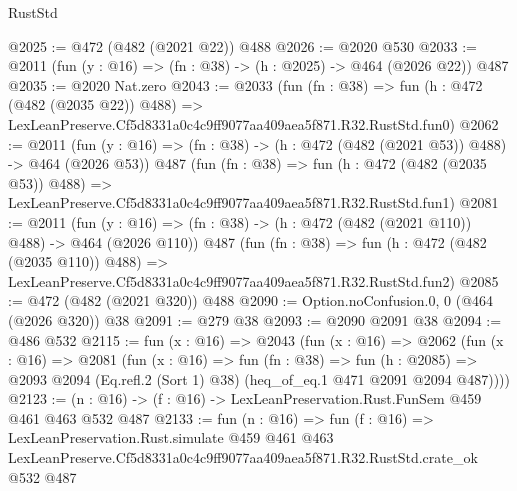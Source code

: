 \begin{lexlean}{RustStd}
\begin{coremodule}
@2025 := @472 (@482 (@2021 @22)) @488
@2026 := @2020 @530
@2033 := @2011 (fun (y : @16) => (fn : @38) -> (h : @2025) -> @464 (@2026 @22)) @487
@2035 := @2020 Nat.zero
@2043 := @2033
    (fun (fn : @38) =>
    fun (h : @472 (@482 (@2035 @22)) @488) =>
    LexLeanPreserve.Cf5d8331a0c4c9ff9077aa409aea5f871.R32.RustStd.fun0)
@2062 := @2011
    (fun (y : @16) => (fn : @38) -> (h : @472 (@482 (@2021 @53)) @488) -> @464 (@2026 @53))
    @487
    (fun (fn : @38) =>
    fun (h : @472 (@482 (@2035 @53)) @488) =>
    LexLeanPreserve.Cf5d8331a0c4c9ff9077aa409aea5f871.R32.RustStd.fun1)
@2081 := @2011
    (fun (y : @16) => (fn : @38) -> (h : @472 (@482 (@2021 @110)) @488) -> @464 (@2026 @110))
    @487
    (fun (fn : @38) =>
    fun (h : @472 (@482 (@2035 @110)) @488) =>
    LexLeanPreserve.Cf5d8331a0c4c9ff9077aa409aea5f871.R32.RustStd.fun2)
@2085 := @472 (@482 (@2021 @320)) @488
@2090 := Option.noConfusion.{0, 0} (@464 (@2026 @320)) @38
@2091 := @279 @38
@2093 := @2090 @2091 @38
@2094 := @486 @532
@2115 := fun (x : @16) =>
  @2043
    (fun (x : @16) =>
    @2062
      (fun (x : @16) =>
      @2081
        (fun (x : @16) =>
        fun (fn : @38) =>
        fun (h : @2085) =>
        @2093 @2094 (Eq.refl.{2} (Sort 1) @38) (heq_of_eq.{1} @471 @2091 @2094 @487))))
@2123 := (n : @16) -> (f : @16) -> LexLeanPreservation.Rust.FunSem @459 @461 @463 @532 @487
@2133 := fun (n : @16) =>
  fun (f : @16) =>
  LexLeanPreservation.Rust.simulate
    @459
    @461
    @463
    LexLeanPreserve.Cf5d8331a0c4c9ff9077aa409aea5f871.R32.RustStd.crate_ok
    @532
    @487
\end{coremodule}
\end{lexlean}
